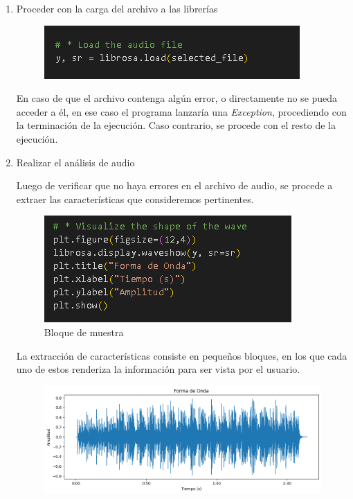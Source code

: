 \documentclass[letterpaper, 12pt]{article}
\begin{document}
\begin{enumerate}
	\item Proceder con la carga del archivo a las librerías

	      \begin{figure}[H]
		      \begin{center}
			      \includegraphics[width=.5\linewidth]{./Images/LoadFile.PNG}
			      \caption{}
		      \end{center}
	      \end{figure}

	      En caso de que el archivo contenga algún error, o
	      directamente no se pueda acceder a él, en ese caso el
	      programa lanzaría una \textit{Exception}, procediendo con
	      la terminación de la ejecución. Caso contrario, se procede
	      con el resto de la ejecución.

	\item Realizar el análisis de audio

	      Luego de verificar que no haya errores en el archivo de
	      audio, se procede a extraer las características que
	      consideremos pertinentes.

	      \begin{figure}
		      \begin{center}
			      \includegraphics[width=.7\linewidth]{./Images/AudioAnalysisSample_1.PNG}
			      \caption{Bloque de muestra}
		      \end{center}
	      \end{figure}

	      La extracción de características consiste en pequeños
	      bloques, en los que cada uno de estos renderiza la
	      información para ser vista por el usuario.

	      \begin{figure}[H]
		      \begin{center}
			      \includegraphics[width=.7\linewidth]{./Images/SampleRunImage_1.png}
			      \caption{}
			      \label{figure:sample_run_image_1}
		      \end{center}
	      \end{figure}


\end{enumerate}
\end{document}
